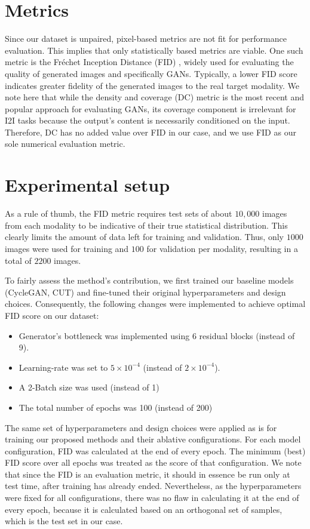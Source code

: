 \section{Metrics}
Since our dataset is unpaired, pixel-based metrics are not fit for performance evaluation. 
This implies that only statistically based metrics are viable.
One such metric is the Fréchet Inception Distance (FID) \cite{DBLP:journals/corr/HeuselRUNKH17}, widely used for evaluating the quality of generated images and specifically GANs.
Typically, a lower FID score indicates greater fidelity of the generated images to the real target modality.
We note here that while the density and coverage (DC) \cite{naeem2020reliable} metric is the most recent and popular approach for evaluating GANs, its coverage component is irrelevant for I2I tasks because the output's content is necessarily conditioned on the input.
Therefore, DC has no added value over FID in our case, and we use FID as our sole numerical evaluation metric.

\section{Experimental setup}
As a rule of thumb, the FID metric requires test sets of about $10,000$ images from each modality to be indicative of their true statistical distribution. 
This clearly limits the amount of data left for training and validation.
Thus, only $1000$ images were used for training and $100$ for validation per modality, resulting in a total of $2200$ images.

To fairly assess the method's contribution, we first trained our baseline models (CycleGAN, CUT) and fine-tuned their original hyperparameters and design choices.
Consequently, the following changes were implemented to achieve optimal FID score on our dataset: 
\begin{itemize}
    \item Generator's bottleneck was implemented using 6 residual blocks (instead of 9).
    \item Learning-rate was set to $5 \times 10^{-4}$ (instead of $2 \times 10^{-4}$).
    \item A 2-Batch size was used (instead of 1)
    \item The total number of epochs was 100 (instead of 200)
\end{itemize}

The same set of hyperparameters and design choices were applied as is for training our proposed methods and their ablative configurations.
For each model configuration, FID was calculated at the end of every epoch.
The minimum (best) FID score over all epochs was treated as the score of that configuration.
We note that since the FID is an evaluation metric, it should in essence be run only at test time, after training has already ended. 
Nevertheless, as the hyperparameters were fixed for all configurations, there was no flaw in calculating it at the end of every epoch, because it is calculated based on an orthogonal set of samples, which is the test set in our case.

